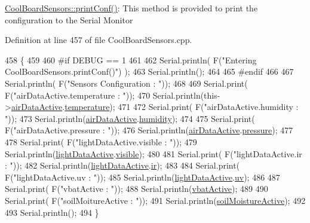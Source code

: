 \hyperlink{class_cool_board_sensors_af6fd79505815b204c178617ecf54c873}{Cool\+Board\+Sensors\+::print\+Conf()}\+: This method is provided to print the configuration to the Serial Monitor 

Definition at line 457 of file Cool\+Board\+Sensors.\+cpp.


\begin{DoxyCode}
458 \{
459 
460 \textcolor{preprocessor}{#if DEBUG == 1}
461 
462     Serial.println( F(\textcolor{stringliteral}{"Entering CoolBoardSensors.printConf()"}) );
463     Serial.println();
464 
465 \textcolor{preprocessor}{#endif}
466 
467     Serial.println( F(\textcolor{stringliteral}{"Sensors Configuration : "}));
468     
469     Serial.print( F(\textcolor{stringliteral}{"airDataActive.temperature : "}));
470     Serial.println(this->\hyperlink{class_cool_board_sensors_abff8dfeccb2f7689847bb64d5f1cd31e}{airDataActive}.\hyperlink{struct_cool_board_sensors_1_1air_active_ac08576736c7ac3bfbfec32e5ee17c686}{temperature});
471 
472     Serial.print( F(\textcolor{stringliteral}{"airDataActive.humidity : "}));
473     Serial.println(\hyperlink{class_cool_board_sensors_abff8dfeccb2f7689847bb64d5f1cd31e}{airDataActive}.\hyperlink{struct_cool_board_sensors_1_1air_active_ab69738e9fd1c2ba80dc666bcd1e116f7}{humidity});
474 
475     Serial.print( F(\textcolor{stringliteral}{"airDataActive.pressure : "}));
476     Serial.println(\hyperlink{class_cool_board_sensors_abff8dfeccb2f7689847bb64d5f1cd31e}{airDataActive}.\hyperlink{struct_cool_board_sensors_1_1air_active_a15932ccfb6ee6603713d937ec9b76b72}{pressure});
477 
478     Serial.print( F(\textcolor{stringliteral}{"lightDataActive.visible : "}));
479     Serial.println(\hyperlink{class_cool_board_sensors_ac4deb1cf41bac8b91c780c92fab00ba4}{lightDataActive}.\hyperlink{struct_cool_board_sensors_1_1light_active_a9c351100969d0dc055ad2e6712cc7ac8}{visible});
480 
481     Serial.print( F(\textcolor{stringliteral}{"lightDataActive.ir : "}));
482     Serial.println(\hyperlink{class_cool_board_sensors_ac4deb1cf41bac8b91c780c92fab00ba4}{lightDataActive}.\hyperlink{struct_cool_board_sensors_1_1light_active_a4c21258d3c89c6292740d6deb10f9dcc}{ir});
483 
484     Serial.print( F(\textcolor{stringliteral}{"lightDataActive.uv : "}));
485     Serial.println(\hyperlink{class_cool_board_sensors_ac4deb1cf41bac8b91c780c92fab00ba4}{lightDataActive}.\hyperlink{struct_cool_board_sensors_1_1light_active_a0e6cfc311425a31f32c32fc3b834ffb8}{uv});
486     
487     Serial.print( F(\textcolor{stringliteral}{"vbatActive : "}));
488     Serial.println(\hyperlink{class_cool_board_sensors_ab0b4bbae83796b52b90f91008d383583}{vbatActive});
489 
490     Serial.print( F(\textcolor{stringliteral}{"soilMoitureActive : "}));
491     Serial.println(\hyperlink{class_cool_board_sensors_ae7971bf527781ac4994309591b78ab89}{soilMoistureActive});
492 
493     Serial.println();
494 \}
\end{DoxyCode}
